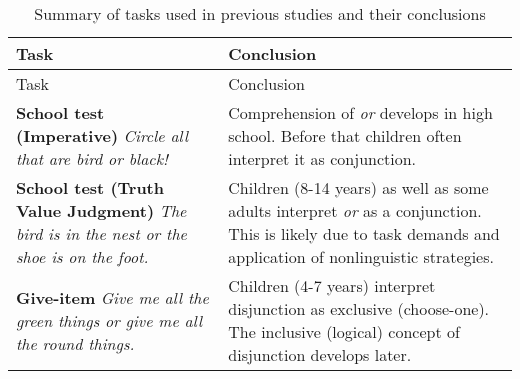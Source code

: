 \documentclass[,man,floatsintext]{apa6}
\begin{document}
\begin{longtable}[]{@{}ll@{}}
\caption{\label{tab:conclusionsReview} Summary of tasks used in previous studies and their conclusions}\tabularnewline
\toprule
\begin{minipage}[b]{0.42\columnwidth}\raggedright
Task\strut
\end{minipage} & \begin{minipage}[b]{0.52\columnwidth}\raggedright
Conclusion\strut
\end{minipage}\tabularnewline
\midrule
\endfirsthead
\toprule
\begin{minipage}[b]{0.42\columnwidth}\raggedright
Task\strut
\end{minipage} & \begin{minipage}[b]{0.52\columnwidth}\raggedright
Conclusion\strut
\end{minipage}\tabularnewline
\midrule
\endhead
\begin{minipage}[t]{0.42\columnwidth}\raggedright
\textbf{School test (Imperative)} \newline \textit{Circle all that are bird or black!}\strut
\end{minipage} & \begin{minipage}[t]{0.52\columnwidth}\raggedright
Comprehension of \emph{or} develops in high school. Before that children often interpret it as conjunction.\strut
\end{minipage}\tabularnewline
\begin{minipage}[t]{0.42\columnwidth}\raggedright
\textbf{School test (Truth Value Judgment)} \newline \textit{The bird is in the nest or the shoe is on the foot.}\strut
\end{minipage} & \begin{minipage}[t]{0.52\columnwidth}\raggedright
Children (8-14 years) as well as some adults interpret \emph{or} as a conjunction. This is likely due to task demands and application of nonlinguistic strategies.\strut
\end{minipage}\tabularnewline
\begin{minipage}[t]{0.42\columnwidth}\raggedright
\textbf{Give-item} \newline \textit{Give me all the green things or give me all the round things.}\strut
\end{minipage} & \begin{minipage}[t]{0.52\columnwidth}\raggedright
Children (4-7 years) interpret disjunction as exclusive (choose-one). The inclusive (logical) concept of disjunction develops later.\strut

\end{minipage}
\end{longtable}
\end{document}
